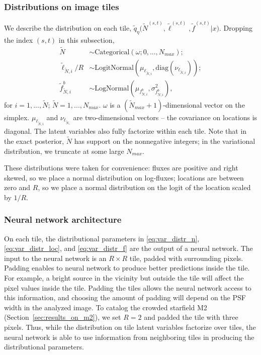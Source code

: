 \subsubsection{Distributions on image tiles}
We describe the distribution on each tile,
$\tilde q_\eta\big(\tilde N^{(s, t)}, \tilde \ell^{(s, t)}, \tilde f^{(s, t)} | x\big)$. Dropping the index 
$(s,t)$ in this subsection, 
\begin{align}
    \tilde N &\sim \text{Categorical}(
    \omega; 0, ..., N_{max});  \label{eq:var_distr_n}\\
	\tilde \ell_{\tilde N, i} / R &\sim \text{LogitNormal}(\mu_{\ell_{\tilde N, i}}, \text{diag}(\nu_{\ell_{\tilde N, i}}) )\label{eq:var_distr_loc}; \\
	\tilde f^b_{\tilde N, i} &\sim \text{LogNormal}(\mu_{f^b_{\tilde N, i}}, \sigma^2_{f^b_{\tilde N, i}}), \label{eq:var_distr_f}
\end{align}
for $i = 1, ..., \tilde N$; $\tilde{N} = 1, ..., N_{max}$. 
$\omega$ is a $(\tilde N_{max} + 1)$-dimensional vector on the simplex. $\mu_{\ell_{\tilde N, i}}$ and $\nu_{\ell_{\tilde N, }}$ are two-dimensional vectors -- the covariance on locations is diagonal. 
The latent variables also fully factorize within each tile. Note that in the exact posterior, $\tilde N$ has support on the nonnegative integers; in the variational distribution, we truncate at some large $N_{max}$. 


These distributions were taken for convenience: fluxes are positive and right skewed, so we place a normal distribution on log-fluxes; locations are between zero and $R$, so 
we place a normal distribution on the logit of the location scaled by $1 / R$. 

\subsubsection{Neural network architecture}
\label{sec:nn_archetecture}

On each tile, the distributional parameters in \eqref{eq:var_distr_n},
\eqref{eq:var_distr_loc}, and \eqref{eq:var_distr_f} are the output of a neural network. 
The input to the neural network is an $R \times R$ tile, padded with surrounding pixels.
Padding enables to neural network to produce better predictions inside the tile. 
For example, a bright source in the vicinity but outside the tile will affect the pixel values inside the tile. 
Padding the tiles allows the neural network access to this information, and choosing the amount of padding will depend on the PSF width in the analyzed image. 
To catalog the crowded starfield M2 (Section~\ref{sec:results_on_m2}),
we set $R = 2$ and padded the tile with three pixels.
Thus, while the distribution on tile latent variables factorize over tiles, the neural network is able to use information from neighboring tiles in producing the distributional parameters. 


